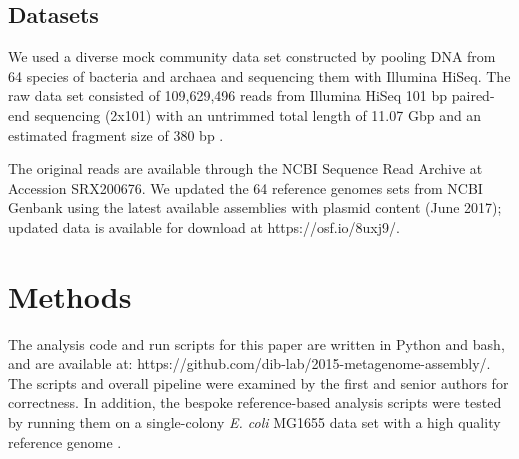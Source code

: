 \documentclass[11pt]{article}
\begin{document}


 

\subsection*{Datasets}

We used a diverse mock community data set constructed by pooling DNA
from 64 species of bacteria and archaea and sequencing them with
Illumina HiSeq.  The raw data set consisted of 109,629,496 reads from
Illumina HiSeq 101 bp paired-end sequencing (2x101) with an untrimmed
total length of 11.07 Gbp and an estimated fragment size of 380 bp
\cite{podar}.
 
The original reads are available through the NCBI Sequence Read
Archive at Accession SRX200676.  We updated the 64 reference genomes
sets from NCBI Genbank using the latest available assemblies with
plasmid content (June 2017); updated data is available for download at
https://osf.io/8uxj9/.

\section*{Methods}

The analysis code and run scripts for this paper are written in Python
and bash, and are available at:
https://github.com/dib-lab/2015-metagenome-assembly/. The scripts and
overall pipeline were examined by the first and senior authors for
correctness.  In addition, the bespoke reference-based analysis
scripts were tested by running them on a single-colony {\em E. coli} MG1655
data set with a high quality reference genome \cite{chitsaz2011}.
\end{document}
